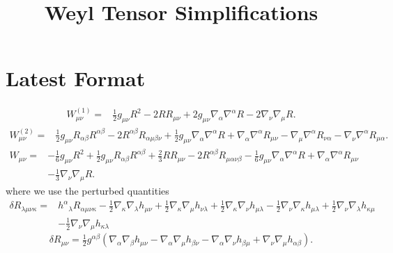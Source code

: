 \documentclass[10pt,letterpaper]{article}
\title{Weyl Tensor Simplifications}
\date{}
\begin{document}
\maketitle
\noindent

\section*{Latest Format}
\begin{align}
W^{(1)}_{\mu\nu}={}&\tfrac{1}{2} g_{\mu \nu} R^2
 - 2 R R_{\mu \nu}
 + 2 g_{\mu \nu} \nabla_{\alpha}\nabla^{\alpha}R
 - 2 \nabla_{\nu}\nabla_{\mu}R.
\end{align}
\begin{align}
W^{(2)}_{\mu\nu}={}&\tfrac{1}{2} g_{\mu \nu} R_{\alpha \beta} R^{\alpha \beta}
 - 2 R^{\alpha \beta} R_{\alpha \mu \beta \nu}
 + \tfrac{1}{2} g_{\mu \nu} \nabla_{\alpha}\nabla^{\alpha}R
 + \nabla_{\alpha}\nabla^{\alpha}R_{\mu \nu}
 -  \nabla_{\mu}\nabla^{\alpha}R_{\nu \alpha}
 -  \nabla_{\nu}\nabla^{\alpha}R_{\mu \alpha}.
\end{align}
\begin{align}
W_{\mu\nu}={}&- \tfrac{1}{6} g_{\mu \nu} R^2
 + \tfrac{1}{2} g_{\mu \nu} R_{\alpha \beta} R^{\alpha \beta}
 + \tfrac{2}{3} R R_{\mu \nu}
 - 2 R^{\alpha \beta} R_{\mu \alpha \nu \beta}
 -  \tfrac{1}{6} g_{\mu \nu} \nabla_{\alpha}\nabla^{\alpha}R
 + \nabla_{\alpha}\nabla^{\alpha}R_{\mu \nu}\nonumber\\
& -  \tfrac{1}{3} \nabla_{\nu}\nabla_{\mu}R.
\end{align}
where we use the perturbed quantities
\begin{align}
\delta R_{\lambda\mu\nu\kappa}={}&h^{\alpha}{}_{\lambda} R_{\alpha \mu \nu \kappa}
 -  \tfrac{1}{2} \nabla_{\kappa}\nabla_{\lambda}h_{\mu \nu}
 + \tfrac{1}{2} \nabla_{\kappa}\nabla_{\mu}h_{\nu \lambda}
 + \tfrac{1}{2} \nabla_{\kappa}\nabla_{\nu}h_{\mu \lambda}
 -  \tfrac{1}{2} \nabla_{\nu}\nabla_{\kappa}h_{\mu \lambda}
 + \tfrac{1}{2} \nabla_{\nu}\nabla_{\lambda}h_{\kappa \mu}\nonumber\\
& -  \tfrac{1}{2} \nabla_{\nu}\nabla_{\mu}h_{\kappa \lambda}
\end{align}
\begin{equation}
	\delta R_{\mu\nu} = \tfrac{1}{2} g^{\alpha \beta} (\nabla_{\alpha}\nabla_{\beta}h_{\mu \nu} -  \nabla_{\alpha}\nabla_{\mu}h_{\beta \nu} -  \nabla_{\alpha}\nabla_{\nu}h_{\beta \mu} + \nabla_{\nu}\nabla_{\mu}h_{\alpha \beta}).
\end{equation}
\end{document}
